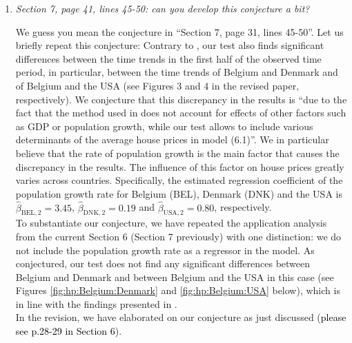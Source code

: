 \documentclass[a4paper,12pt]{article}
\newcommand{\reference}[1]{\textcolor{black}{#1}}
\begin{document}
\begin{enumerate}[label=\arabic*.,leftmargin=0.6cm]
\item \textit{Section 7, page 41, lines 45-50: can you develop this conjecture a bit?}

We guess you mean the conjecture in ``Section 7, page 31, lines 45-50''. Let us briefly repeat this conjecture: Contrary to \cite{Knoll2017}, our test also finds significant differences between the time trends in the first half of the observed time period, in particular, between the time trends of Belgium and Denmark and of Belgium and the USA (see Figures 3 and 4 in the revised paper, respectively). We conjecture that this discrepancy in the results is ``due to the fact that the method used in \cite{Knoll2017} does not account for effects of other factors such as GDP or population growth, while our test allows to include various determinants of the average house prices in model (6.1)''. We in particular believe that the rate of population growth is the main factor that causes the discrepancy in the results. The influence of this factor on house prices greatly varies across countries. Specifically, the estimated regression coefficient of the population growth rate for Belgium (BEL), Denmark (DNK) and the USA is $\widehat{\beta}_{\text{BEL}, 2} = 3.45$, $\widehat{\beta}_{\text{DNK}, 2} = 0.19$ and $\widehat{\beta}_{\text{USA}, 2} = 0.80$, respectively. \\
To substantiate our conjecture, we have repeated the application analysis from the current Section 6 (Section 7 previously) with one distinction: we do not include the population growth rate as a regressor in the model.
As conjectured, our test does not find any significant differences between Belgium and Denmark and between Belgium and the USA in this case (see Figures \ref{fig:hp:Belgium:Denmark} and \ref{fig:hp:Belgium:USA} below), which is in line with the findings presented in \cite{Knoll2017}. \\
In the revision, we have elaborated on our conjecture as just discussed (\reference{please see p.28-29 in Section 6}).


\end{enumerate}
\end{document}
